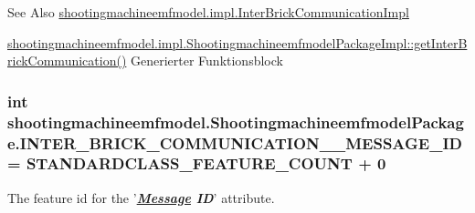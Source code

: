\begin{DoxySeeAlso}{See Also}
\hyperlink{classshootingmachineemfmodel_1_1impl_1_1_inter_brick_communication_impl}{shootingmachineemfmodel.\-impl.\-Inter\-Brick\-Communication\-Impl} 

\hyperlink{classshootingmachineemfmodel_1_1impl_1_1_shootingmachineemfmodel_package_impl_a6dcf03b9cd465e27248a0278c6e55f11}{shootingmachineemfmodel.\-impl.\-Shootingmachineemfmodel\-Package\-Impl\-::get\-Inter\-Brick\-Communication()} Generierter Funktionsblock 
\end{DoxySeeAlso}
\hypertarget{interfaceshootingmachineemfmodel_1_1_shootingmachineemfmodel_package_a291f0af122b36942c2271b0c1b5fc389}{
\subsubsection[{I\-N\-T\-E\-R\-\_\-\-B\-R\-I\-C\-K\-\_\-\-C\-O\-M\-M\-U\-N\-I\-C\-A\-T\-I\-O\-N\-\_\-\-\_\-\-M\-E\-S\-S\-A\-G\-E\-\_\-\-I\-D}]{\setlength{\rightskip}{0pt plus 5cm}int shootingmachineemfmodel.\-Shootingmachineemfmodel\-Package.\-I\-N\-T\-E\-R\-\_\-\-B\-R\-I\-C\-K\-\_\-\-C\-O\-M\-M\-U\-N\-I\-C\-A\-T\-I\-O\-N\-\_\-\-\_\-\-M\-E\-S\-S\-A\-G\-E\-\_\-\-I\-D = {\bf S\-T\-A\-N\-D\-A\-R\-D\-C\-L\-A\-S\-S\-\_\-\-F\-E\-A\-T\-U\-R\-E\-\_\-\-C\-O\-U\-N\-T} + 0}}\label{interfaceshootingmachineemfmodel_1_1_shootingmachineemfmodel_package_a291f0af122b36942c2271b0c1b5fc389}
The feature id for the '{\itshape {\bfseries \hyperlink{interfaceshootingmachineemfmodel_1_1_message}{Message} I\-D}}' attribute.

